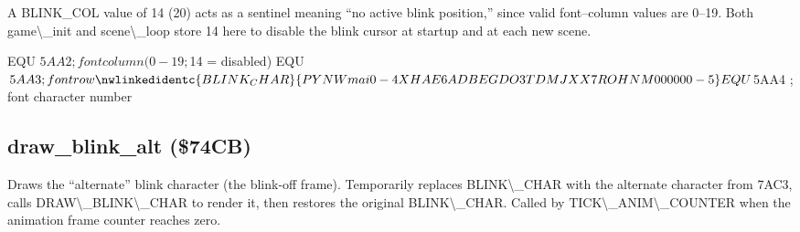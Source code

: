 \documentclass[10pt]{report}
\begin{document}
A {\Tt{}BLINK{\_}COL\nwendquote} value of {\Tt{}{\textbackslash}{\$}14\nwendquote} (20) acts as a sentinel meaning ``no active
blink position,'' since valid font--column values are 0--19.  Both
{\Tt{}game{\textbackslash}{\_}init\nwendquote} and {\Tt{}scene{\textbackslash}{\_}loop\nwendquote} store {\Tt{}{\textbackslash}{\$}14\nwendquote} here to disable the blink
cursor at startup and at each new scene.

\nwenddocs{}\plusendmoddef\nwstartdeflinemarkup{}\nwenddeflinemarkup
{}       EQU     $5AA2   ; font column  (0-19; $14 = disabled)
       EQU     $5AA3   ; font row
\nwlinkedidentc{BLINK_CHAR}{PYNWmai0-4XHAE6ADBEGDO3TDMJXX7ROHNM000000-5}      EQU     $5AA4   ; font character number
\eatline
{}\nwendcode{}\nwdocspar

\subsection{draw\_blink\_alt (\$74CB)}

Draws the ``alternate'' blink character (the blink-off frame).
Temporarily replaces {\Tt{}BLINK{\textbackslash}{\_}CHAR\nwendquote} with the alternate character from
{\Tt{}{\textbackslash}{\$}7AC3\nwendquote}, calls {\Tt{}DRAW{\textbackslash}{\_}BLINK{\textbackslash}{\_}CHAR\nwendquote} to render it, then restores
the original {\Tt{}BLINK{\textbackslash}{\_}CHAR\nwendquote}.  Called by {\Tt{}TICK{\textbackslash}{\_}ANIM{\textbackslash}{\_}COUNTER\nwendquote} when
the animation frame counter reaches zero.
\end{document}
